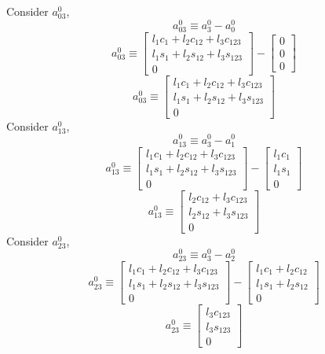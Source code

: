 \documentclass[12pt]{article}
\begin{document}
Consider $a_{03}^0$,
\[
  a_{03}^0 \equiv a_3^0 - a_0^0
\]
\[
  a_{03}^0 \equiv
  \begin{bmatrix}
    l_1c_1 + l_2c_{12} + l_3c_{123}\\
    l_1s_1 + l_2s_{12} + l_3s_{123}\\
    0
  \end{bmatrix}
  -
  \begin{bmatrix} 0 \\ 0 \\ 0  \end{bmatrix}
\]
\[
  a_{03}^0 \equiv
  \begin{bmatrix}
    l_1c_1 + l_2c_{12} + l_3c_{123}\\
    l_1s_1 + l_2s_{12} + l_3s_{123}\\
    0
  \end{bmatrix}
\]
Consider $a_{13}^0$,
\[
  a_{13}^0 \equiv a_3^0 - a_1^0
\]
\[
  a_{13}^0 \equiv
  \begin{bmatrix}
    l_1c_1 + l_2c_{12} + l_3c_{123}\\
    l_1s_1 + l_2s_{12} + l_3s_{123}\\
    0
  \end{bmatrix}
  -
  \begin{bmatrix}
    l_1c_1\\
    l_1s_1\\
    0
  \end{bmatrix}
\]
\[
  a_{13}^0 \equiv
  \begin{bmatrix}
    l_2c_{12} + l_3c_{123}\\
    l_2s_{12} + l_3s_{123}\\
    0
  \end{bmatrix}
\]
Consider $a_{23}^0$,
\[
  a_{23}^0 \equiv a_3^0 - a_2^0
\]
\[
  a_{23}^0 \equiv
  \begin{bmatrix}
    l_1c_1 + l_2c_{12} + l_3c_{123}\\
    l_1s_1 + l_2s_{12} + l_3s_{123}\\
    0
  \end{bmatrix}
  -
  \begin{bmatrix}
    l_1c_1 + l_2c_{12}\\
    l_1s_1 + l_2s_{12}\\
    0
  \end{bmatrix}
\]
\[
  a_{23}^0 \equiv
  \begin{bmatrix}
    l_3c_{123}\\
    l_3s_{123}\\
    0
  \end{bmatrix}
\]
\end{document}
